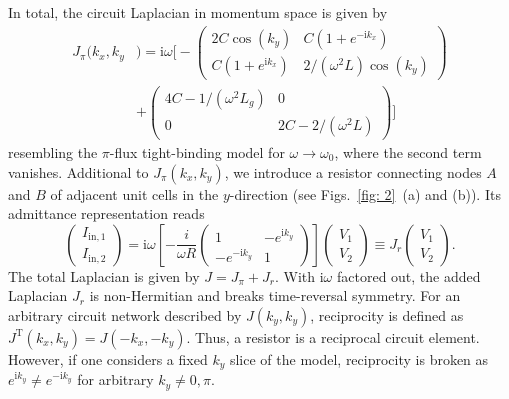 In total, the circuit Laplacian in momentum space is given by
\begin{equation}
\begin{aligned}
J_\pi(k_x,k_y&) = \mathrm{i} \omega \bigg[
	-\begin{pmatrix}
	2 C \cos(k_y)  & C(1 + e^{-\mathrm{i} k_x}) \\
	C(1+e^{\mathrm{i} k_x}) & 2/(\omega^2 L) \cos(k_y) 
	\end{pmatrix}  \\
	&+
	\begin{pmatrix}	
	4 C - 1/(\omega^2 L_g) & 0 \\
	0 & 2 C - 2/(\omega^2 L)
	\end{pmatrix}
\bigg]
\end{aligned}
\end{equation}
resembling the $\pi$-flux tight-binding model for $\omega \rightarrow \omega_0$, where the second term vanishes. Additional to $J_\pi(k_x,k_y)$, we introduce a resistor connecting nodes $A$ and $B$ of adjacent unit cells in the $y$-direction (see Figs.~\ref{fig: 2}~(a) and (b)). Its admittance representation reads
\begin{equation}
\begin{pmatrix}
I_{\text{in},1}\\I_{\text{in},2} 
\end{pmatrix}
= \mathrm{i}\omega \left[ - \frac{i}{\omega R}
\begin{pmatrix}
1 & -e^{\mathrm{i} k_y} \\ -e^{-\mathrm{i} k_y} & 1
\end{pmatrix}
\right]
\begin{pmatrix}
V_1 \\ V_2
\end{pmatrix}  \equiv J_{r} \begin{pmatrix}
V_1 \\ V_2
\end{pmatrix}.
\end{equation}
The total Laplacian is given by $J = J_{\pi} +J_r$. With $\mathrm{i} \omega$ factored out, the added Laplacian $J_r$ is non-Hermitian and breaks time-reversal symmetry. For an arbitrary circuit network described by $J(k_y,k_y)$, reciprocity is defined as $J^{\mathrm{T}} (k_x, k_y) = J(-k_x, -k_y)$. Thus, a resistor is a reciprocal circuit element. However, if one considers a fixed $k_y$ slice of the model, reciprocity is broken as $e^{\mathrm{i} k_y} \neq e^{-\mathrm{i} k_y}$ for arbitrary $k_y\neq 0,\pi$. 

